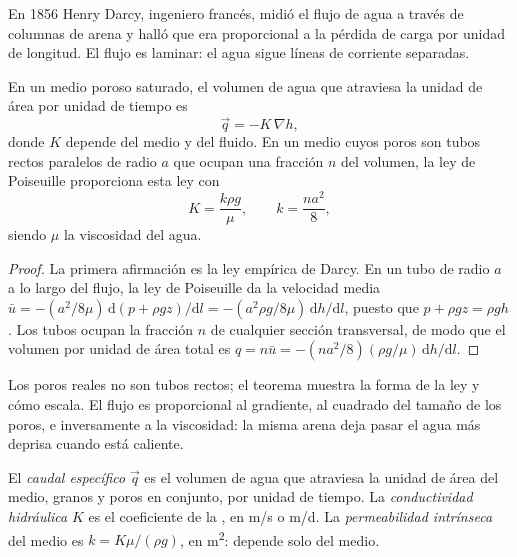 En 1856 Henry Darcy, ingeniero francés, midió el flujo de agua a través de
columnas de arena y halló que era proporcional a la pérdida de carga por unidad de
longitud. El flujo es laminar: el agua sigue líneas de corriente separadas.

\begin{theorem}\label{thm:b3:hydrogeology:darcy}
En un medio poroso saturado, el volumen de agua que atraviesa la unidad de área por
unidad de tiempo es
\[
\vec q = -K\,\nabla h ,
\]
donde $K$ depende del medio y del fluido. En un medio cuyos poros
son tubos rectos paralelos de radio $a$ que ocupan una fracción $n$ del
volumen, la ley de Poiseuille proporciona esta ley con
\[
K = \frac{k\rho g}{\mu}, \qquad k = \frac{na^2}{8} ,
\]
siendo $\mu$ la viscosidad del agua.
\end{theorem}

\begin{proof}
La primera afirmación es la ley empírica de Darcy. En un tubo de radio $a$
a lo largo del flujo, la ley de Poiseuille da la velocidad media $\bar u =
-(a^2/8\mu)\,\mathrm d(p + \rho gz)/\mathrm dl = -(a^2\rho g/8\mu)\,\mathrm
dh/\mathrm dl$, puesto que $p + \rho gz = \rho g h$. Los tubos ocupan la
fracción $n$ de cualquier sección transversal, de modo que el volumen por unidad de área total es
$q = n\bar u = -(na^2/8)(\rho g/\mu)\,\mathrm dh/\mathrm dl$.
\end{proof}

Los poros reales no son tubos rectos; el teorema muestra la forma de la ley
y cómo escala. El flujo es proporcional al gradiente, al cuadrado
del tamaño de los poros, e inversamente a la viscosidad: la misma arena
deja pasar el agua más deprisa cuando está caliente.

\begin{definition}\label{def:b3:hydrogeology:darcy}
El \emph{caudal específico} $\vec q$ es el
volumen de agua que atraviesa la unidad de área del medio, granos y poros
en conjunto, por unidad de tiempo. La \emph{conductividad
hidráulica} $K$ es el coeficiente de la
, en \unit{m/s} o \unit{m/d}. La \emph{permeabilidad
intrínseca} del medio es $k =
K\mu/(\rho g)$, en \unit{m^2}: depende solo del medio.
\end{definition}

